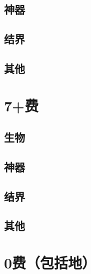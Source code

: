\documentclass[lang = cn, color = black, 10pt]{AllThatStax}
\begin{document}
\section{神器}

\section{结界}

\section{其他}

\chapter{7+费}

\section{生物}

\section{神器}

\section{结界}

\section{其他}

\chapter{0费（包括地）}
\end{document}
